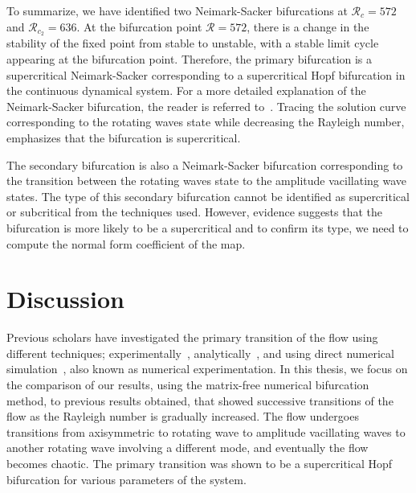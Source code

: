 To summarize, we have identified two Neimark-Sacker bifurcations at $\mathcal{R}_c = 572$ and $\mathcal{R}_{c_2} = 636$.
At the bifurcation point $\mathcal{R}= 572$, there is a change in the stability of the fixed point from stable to unstable, with a stable limit cycle appearing at the bifurcation point. Therefore, the primary bifurcation is a supercritical Neimark-Sacker corresponding to a supercritical Hopf bifurcation in the continuous dynamical system.
For a more detailed explanation of the Neimark-Sacker bifurcation, the reader is referred to~\cite{Kuznet}. Tracing the solution curve corresponding to the rotating waves state while decreasing the Rayleigh number, emphasizes that the bifurcation is supercritical.

The secondary bifurcation is also a Neimark-Sacker bifurcation corresponding to the transition between the rotating waves state to the amplitude vacillating wave states. The type of this secondary bifurcation cannot be identified as supercritical or subcritical from the techniques used. However, evidence suggests that the bifurcation is more likely to be a supercritical and to confirm its type, we need to compute the normal form coefficient of the map.

\section{Discussion}
Previous scholars have investigated the primary transition of the flow using different techniques; experimentally~\cite{BAEWIS,AEWSDaDe}, analytically~\cite{EDCTAFUCF,linearstability}, and using direct numerical simulation~\cite{PeiChunTsain,DNSSAE,LSSE-PeDa}, also known as numerical experimentation. In this thesis, we focus on the comparison of our results, using the matrix-free numerical bifurcation method, to previous results obtained, that showed successive transitions of the flow as the Rayleigh number is gradually increased. The flow undergoes transitions from axisymmetric to rotating wave to amplitude vacillating waves to another rotating wave involving a different mode, and eventually the flow becomes chaotic.  The primary transition was shown to be a supercritical Hopf bifurcation for various parameters of the system.

